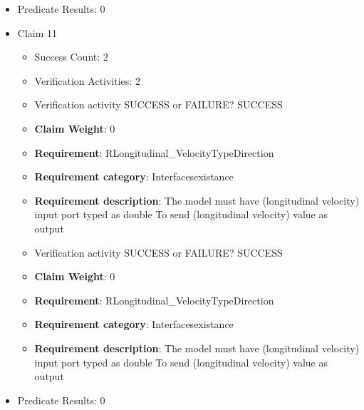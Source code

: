 \documentclass{article}
\begin{document}
\begin{itemize}
\begin{itemize}
					\item Verification activity SUCCESS or FAILURE? FAILURE
					\item \textbf{Claim Weight}: 0
						\item \textbf{Requirement}: RWheelsElevationTypeDirection 
						\item \textbf{Requirement category}: Interfacesexistance 
						\item \textbf{Requirement description}: The model must have (wheels elevation) input port typed as boolean To get (wheels elevation) value as input
					
				\end{itemize}
				
									    
				\item Predicate Results: 0

  				  \item Claim 11
				\begin{itemize}
			    	\item Success Count: 2 
			    	\item Verification Activities: 2
					\item Verification activity SUCCESS or FAILURE? SUCCESS
					\item \textbf{Claim Weight}: 0
						\item \textbf{Requirement}: RLongitudinal_VelocityTypeDirection 
						\item \textbf{Requirement category}: Interfacesexistance 
						\item \textbf{Requirement description}: The model must have (longitudinal velocity) input port typed as double To send (longitudinal velocity) value as output
					
					\item Verification activity SUCCESS or FAILURE? SUCCESS
					\item \textbf{Claim Weight}: 0
						\item \textbf{Requirement}: RLongitudinal_VelocityTypeDirection 
						\item \textbf{Requirement category}: Interfacesexistance 
						\item \textbf{Requirement description}: The model must have (longitudinal velocity) input port typed as double To send (longitudinal velocity) value as output
					
				\end{itemize}
				
									    
				\item Predicate Results: 0


\end{itemize}
\end{document}
